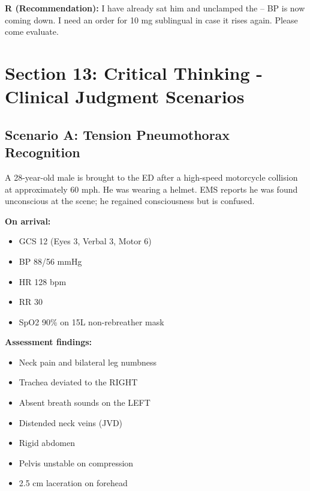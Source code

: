 \documentclass[11pt]{article}
\begin{document}
\vspace{0.3cm}

\textbf{R (Recommendation):} I have already sat him \underline{\hspace{2cm}} and unclamped the \underline{\hspace{2cm}} -- BP is now coming down. I need an order for \underline{\hspace{3cm}} 10 mg sublingual in case it rises again. Please come evaluate.

\vspace{1cm}

\section*{Section 13: Critical Thinking - Clinical Judgment Scenarios}

\subsection*{Scenario A: Tension Pneumothorax Recognition}

\begin{tcolorbox}[colback=red!5!white,colframe=red!75!black,title=Case Presentation]
A 28-year-old male is brought to the ED after a high-speed motorcycle collision at approximately 60 mph. He was wearing a helmet. EMS reports he was found unconscious at the scene; he regained consciousness but is confused.

\textbf{On arrival:}
\begin{itemize}
    \item GCS 12 (Eyes 3, Verbal 3, Motor 6)
    \item BP 88/56 mmHg
    \item HR 128 bpm
    \item RR 30
    \item SpO2 90\% on 15L non-rebreather mask
\end{itemize}

\textbf{Assessment findings:}
\begin{itemize}
    \item Neck pain and bilateral leg numbness
    \item Trachea deviated to the RIGHT
    \item Absent breath sounds on the LEFT
    \item Distended neck veins (JVD)
    \item Rigid abdomen
    \item Pelvis unstable on compression
    \item 2.5 cm laceration on forehead
\end{itemize}
\end{tcolorbox}
\end{document}
